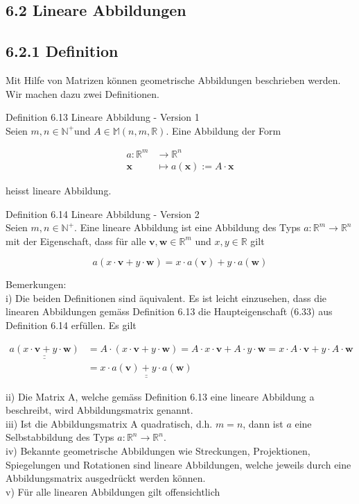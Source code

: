 \documentclass[10pt]{article}
\begin{document}
\subsection*{6.2 Lineare Abbildungen}
\subsection*{6.2.1 Definition}
Mit Hilfe von Matrizen können geometrische Abbildungen beschrieben werden. Wir machen dazu zwei Definitionen.

Definition 6.13 Lineare Abbildung - Version 1\\
Seien $m, n \in \mathbb{N}^{+}$und $A \in \mathbb{M}(n, m, \mathbb{R})$. Eine Abbildung der Form


\begin{align*}
a: \mathbb{R}^{m} & \rightarrow \mathbb{R}^{n} \\
\mathbf{x} & \mapsto a(\mathbf{x}):=A \cdot \mathbf{x} \tag{6.32}
\end{align*}


heisst lineare Abbildung.

Definition 6.14 Lineare Abbildung - Version 2\\
Seien $m, n \in \mathbb{N}^{+}$. Eine lineare Abbildung ist eine Abbildung des Typs $a: \mathbb{R}^{m} \rightarrow \mathbb{R}^{n}$ mit der Eigenschaft, dass für alle $\mathbf{v}, \mathbf{w} \in \mathbb{R}^{m}$ und $x, y \in \mathbb{R}$ gilt


\begin{equation*}
a(x \cdot \mathbf{v}+y \cdot \mathbf{w})=x \cdot a(\mathbf{v})+y \cdot a(\mathbf{w}) \tag{6.33}
\end{equation*}


Bemerkungen:\\
i) Die beiden Definitionen sind äquivalent. Es ist leicht einzusehen, dass die linearen Abbildungen gemäss Definition 6.13 die Haupteigenschaft (6.33) aus Definition 6.14 erfüllen. Es gilt


\begin{align*}
\underline{\underline{a(x \cdot \mathbf{v}+y \cdot \mathbf{w})}} & =A \cdot(x \cdot \mathbf{v}+y \cdot \mathbf{w})=A \cdot x \cdot \mathbf{v}+A \cdot y \cdot \mathbf{w}=x \cdot A \cdot \mathbf{v}+y \cdot A \cdot \mathbf{w} \\
& =\underline{\underline{x \cdot a(\mathbf{v})+y \cdot a(\mathbf{w})}} \tag{6.34}
\end{align*}


ii) Die Matrix A, welche gemäss Definition 6.13 eine lineare Abbildung a beschreibt, wird Abbildungsmatrix genannt.\\
iii) Ist die Abbildungsmatrix A quadratisch, d.h. $m=n$, dann ist $a$ eine Selbstabbildung des Typs $a: \mathbb{R}^{n} \rightarrow \mathbb{R}^{n}$.\\
iv) Bekannte geometrische Abbildungen wie Streckungen, Projektionen, Spiegelungen und Rotationen sind lineare Abbildungen, welche jeweils durch eine Abbildungsmatrix ausgedrückt werden können.\\
v) Für alle linearen Abbildungen gilt offensichtlich
\end{document}
